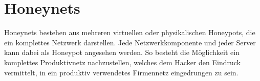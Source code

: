 \chapter{Honeynets}
Honeynets bestehen aus mehreren virtuellen oder physikalischen Honeypots, die ein komplettes Netzwerk darstellen. Jede Netzwerkkomponente und jeder Server kann dabei als Honeypot angesehen werden. So besteht die Möglichkeit ein komplettes Produktivnetz nachzustellen, welches dem Hacker den Eindruck vermittelt, in ein produktiv verwendetes Firmennetz eingedrungen zu sein.




